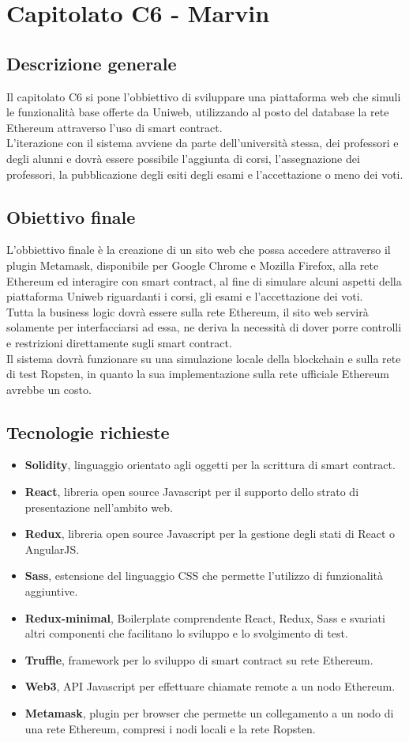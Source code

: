 \documentclass[StudioDiFattibilità.tex]{subfiles}
\begin{document}
\chapter{Capitolato C6 - Marvin}
\section{Descrizione generale}
Il capitolato C6 si pone l'obbiettivo di sviluppare una piattaforma web che simuli le funzionalità base offerte da Uniweb, utilizzando al posto del database la rete Ethereum attraverso l'uso di smart contract.\\
L'iterazione con il sistema avviene da parte dell'università stessa, dei professori e degli alunni e dovrà essere possibile l'aggiunta di corsi, l'assegnazione dei professori, la pubblicazione degli esiti degli esami e l'accettazione o meno dei voti.
\section{Obiettivo finale}
L'obbiettivo finale è la creazione di un sito web che possa accedere attraverso il plugin Metamask, disponibile per Google Chrome e Mozilla Firefox, alla rete Ethereum ed interagire con smart contract, al fine di simulare alcuni aspetti della piattaforma Uniweb riguardanti i corsi, gli esami e l'accettazione dei voti.\\
Tutta la business logic dovrà essere sulla rete Ethereum, il sito web servirà solamente per interfacciarsi ad essa, ne deriva la necessità di dover porre controlli e restrizioni direttamente sugli smart contract.\\
Il sistema dovrà funzionare su una simulazione locale della blockchain e sulla rete di test Ropsten, in quanto la sua implementazione sulla rete ufficiale Ethereum avrebbe un costo.
\section{Tecnologie richieste}
\begin{itemize}
	\item \textbf{Solidity}, linguaggio orientato agli oggetti per la scrittura di smart contract.
	\item \textbf{React}, libreria open source Javascript per il supporto dello strato di presentazione nell'ambito web.
	\item \textbf{Redux}, libreria open source Javascript per la gestione degli stati di React o AngularJS.
	\item \textbf{Sass}, estensione del linguaggio CSS che permette l'utilizzo di funzionalità aggiuntive.
	\item \textbf{Redux-minimal}, Boilerplate comprendente React, Redux, Sass e svariati altri componenti che facilitano lo sviluppo e lo svolgimento di test.
	\item \textbf{Truffle}, framework per lo sviluppo di smart contract su rete Ethereum.
	\item \textbf{Web3}, API Javascript per effettuare chiamate remote a un nodo Ethereum.
	\item \textbf{Metamask}, plugin per browser che permette un collegamento a un nodo di una rete Ethereum, compresi i nodi locali e la rete Ropsten.
\end{itemize}
\end{document}
